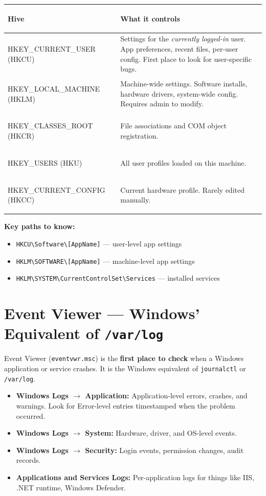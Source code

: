\documentclass[11pt, letterpaper]{article}
\begin{document}
\noindent
{\renewcommand{\arraystretch}{1.6}
\begin{tabularx}{\textwidth}{>{\ttfamily\bfseries\raggedright\arraybackslash}p{5cm}
                              >{\raggedright\arraybackslash}X}
\toprule
\rowcolor{tableheader}
\textbf{Hive} & \textbf{What it controls} \\
\midrule
\rowcolor{rowA}  HKEY\_CURRENT\_USER (HKCU)   & Settings for the \emph{currently logged-in} user. App preferences, recent files, per-user config. First place to look for user-specific bugs. \\
\rowcolor{rowB}  HKEY\_LOCAL\_MACHINE (HKLM)  & Machine-wide settings. Software installs, hardware drivers, system-wide config. Requires admin to modify. \\
\rowcolor{rowA}  HKEY\_CLASSES\_ROOT (HKCR)   & File associations and COM object registration. \\
\rowcolor{rowB}  HKEY\_USERS (HKU)            & All user profiles loaded on this machine. \\
\rowcolor{rowA}  HKEY\_CURRENT\_CONFIG (HKCC) & Current hardware profile. Rarely edited manually. \\
\bottomrule
\end{tabularx}}

\textbf{Key paths to know:}
\begin{itemize}[noitemsep]
  \item \texttt{HKCU\textbackslash Software\textbackslash [AppName]} --- user-level app settings
  \item \texttt{HKLM\textbackslash SOFTWARE\textbackslash [AppName]} --- machine-level app settings
  \item \texttt{HKLM\textbackslash SYSTEM\textbackslash CurrentControlSet\textbackslash Services} --- installed services
\end{itemize}

\section*{Event Viewer --- Windows' Equivalent of \texttt{/var/log}}

Event Viewer (\texttt{eventvwr.msc}) is the \textbf{first place to check} when a Windows application or service crashes. It is the Windows equivalent of \texttt{journalctl} or \texttt{/var/log}.

\begin{itemize}[noitemsep]
  \item \textbf{Windows Logs $\to$ Application:} Application-level errors, crashes, and warnings. Look for Error-level entries timestamped when the problem occurred.
  \item \textbf{Windows Logs $\to$ System:} Hardware, driver, and OS-level events.
  \item \textbf{Windows Logs $\to$ Security:} Login events, permission changes, audit records.
  \item \textbf{Applications and Services Logs:} Per-application logs for things like IIS, .NET runtime, Windows Defender.
\end{itemize}
\end{document}
